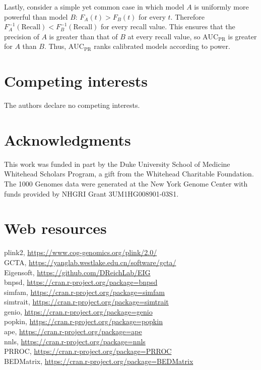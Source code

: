 \documentclass[11pt]{article}
\newcommand{\auc}{\text{AUC}_\text{PR}}
\begin{document}
\begin{linenumbers}
Lastly, consider a simple yet common case in which model $A$ is uniformly more powerful than model $B$: $F_A(t) > F_B(t)$ for every $t$.
Therefore $F_A^{-1}( \text{Recall} ) < F_B^{-1}( \text{Recall} )$ for every recall value.
This ensures that the precision of $A$ is greater than that of $B$ at every recall value, so $\auc$ is greater for $A$ than $B$.
Thus, $\auc$ ranks calibrated models according to power.


\section*{Competing interests}
The authors declare no competing interests.

\section*{Acknowledgments}
This work was funded in part by the Duke University School of Medicine Whitehead Scholars Program, a gift from the Whitehead Charitable Foundation.
The 1000 Genomes data were generated at the New York Genome Center with funds provided by NHGRI Grant 3UM1HG008901-03S1.

\section*{Web resources}
plink2, \url{https://www.cog-genomics.org/plink/2.0/}\\
GCTA, \url{https://yanglab.westlake.edu.cn/software/gcta/}\\
Eigensoft, \url{https://github.com/DReichLab/EIG}\\
bnpsd, \url{https://cran.r-project.org/package=bnpsd}\\
simfam, \url{https://cran.r-project.org/package=simfam}\\
simtrait, \url{https://cran.r-project.org/package=simtrait}\\
genio, \url{https://cran.r-project.org/package=genio}\\
popkin, \url{https://cran.r-project.org/package=popkin}\\
ape, \url{https://cran.r-project.org/package=ape}\\
nnls, \url{https://cran.r-project.org/package=nnls}\\
PRROC, \url{https://cran.r-project.org/package=PRROC}\\
BEDMatrix, \url{https://cran.r-project.org/package=BEDMatrix}


\end{linenumbers}
\end{document}
